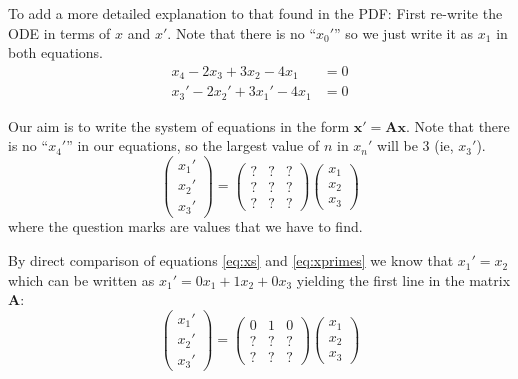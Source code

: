 To add a more detailed explanation to that found in the PDF: First re-write the ODE in terms of $x$ and $x'$. Note that there is no ``$x_0'$'' so we just write it as $x_1$ in both equations.
\begin{align}
    x_4 - 2 x_3 + 3 x_2 - 4 x_1 &= 0 \label{eq:xs} \\
    x_3' - 2 x_2' + 3 x_1' - 4 x_1 &= 0 \label{eq:xprimes}
\end{align}

Our aim is to write the system of equations in the form $\bm{x'} = \bm{A}\bm{x}$. Note that there is no ``$x_4'$'' in our equations, so the largest value of $n$ in $x_n'$ will be 3 (ie, $x_3'$).
\begin{equation}
    \left(
        \begin{array}{c}
            x_1' \\
            x_2' \\
            x_3'
        \end{array}
    \right)
    =
    \left(
        \begin{array}{ccc}
            ? & ? & ? \\
            ? & ? & ? \\
            ? & ? & ?
        \end{array}
    \right)
    \left(
        \begin{array}{c}
            x_1 \\
            x_2 \\
            x_3
        \end{array}
    \right)
\end{equation}
where the question marks are values that we have to find.

By direct comparison of equations \ref{eq:xs} and \ref{eq:xprimes} we know that $x_1' = x_2$ which can be written as $x_1' = 0 x_1 + 1 x_2 + 0 x_3$ yielding the first line in the matrix $\bm{A}$:
\begin{equation}
    \left(
        \begin{array}{c}
            x_1' \\
            x_2' \\
            x_3'
        \end{array}
    \right)
    =
    \left(
        \begin{array}{ccc}
            0 & 1 & 0 \\
            ? & ? & ? \\
            ? & ? & ?
        \end{array}
    \right)
    \left(
        \begin{array}{c}
            x_1 \\
            x_2 \\
            x_3
        \end{array}
    \right)
\end{equation}

